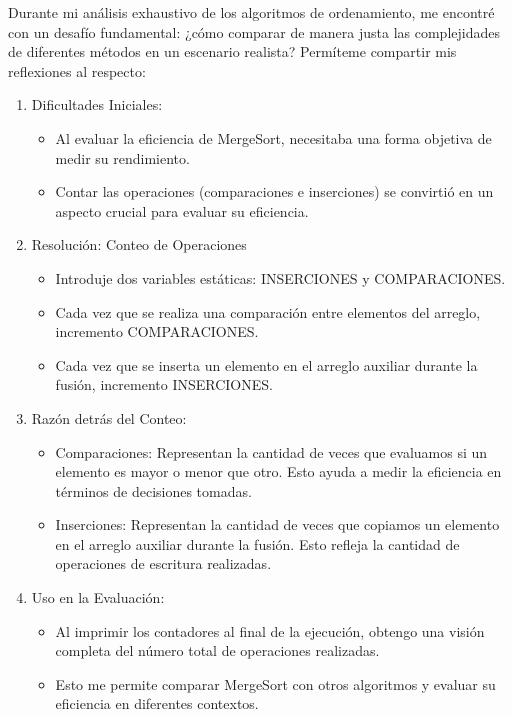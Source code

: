 \documentclass[12pt]{article}
\begin{document}
Durante mi análisis exhaustivo de los algoritmos de ordenamiento, me encontré con un desafío fundamental: ¿cómo comparar de manera justa las complejidades de diferentes métodos en un escenario realista? Permíteme compartir mis reflexiones al respecto:
\begin{enumerate}
    \item Dificultades Iniciales:
          \begin{itemize}
              \item Al evaluar la eficiencia de MergeSort, necesitaba una forma objetiva de medir su rendimiento.
              \item Contar las operaciones (comparaciones e inserciones) se convirtió en un aspecto crucial para evaluar su eficiencia.
          \end{itemize}
    \item Resolución: Conteo de Operaciones
          \begin{itemize}
              \item Introduje dos variables estáticas: INSERCIONES y COMPARACIONES.
              \item Cada vez que se realiza una comparación entre elementos del arreglo, incremento COMPARACIONES.
              \item Cada vez que se inserta un elemento en el arreglo auxiliar durante la fusión, incremento INSERCIONES.
          \end{itemize}
    \item Razón detrás del Conteo:
          \begin{itemize}
              \item Comparaciones: Representan la cantidad de veces que evaluamos si un elemento es mayor o menor que otro. Esto ayuda a medir la eficiencia en términos de decisiones tomadas.
              \item Inserciones: Representan la cantidad de veces que copiamos un elemento en el arreglo auxiliar durante la fusión. Esto refleja la cantidad de operaciones de escritura realizadas.
          \end{itemize}
    \item Uso en la Evaluación:
          \begin{itemize}
              \item Al imprimir los contadores al final de la ejecución, obtengo una visión completa del número total de operaciones realizadas.
              \item Esto me permite comparar MergeSort con otros algoritmos y evaluar su eficiencia en diferentes contextos.
          \end{itemize}
\end{enumerate}
\end{document}
